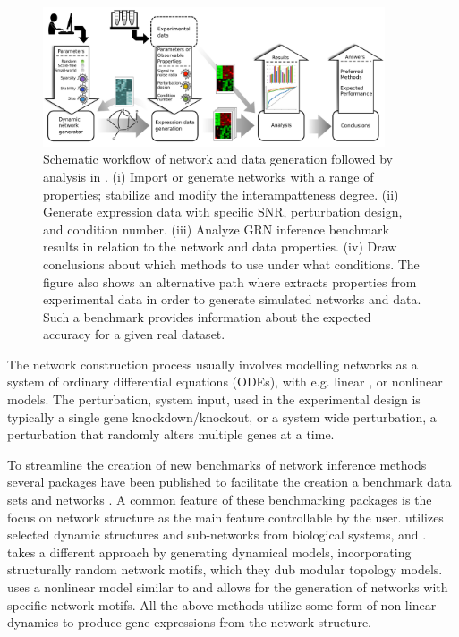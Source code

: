 \begin{figure}
\centering
\includegraphics[width=0.9\textwidth]{img/pipeline.pdf}
\captionsetup{width=0.9\textwidth}
\caption{Schematic workflow of network and data generation followed by analysis in \gs. (i) Import or generate networks with a range of properties; stabilize and modify the interampatteness degree. (ii) Generate expression data with specific SNR, perturbation design, and condition number. (iii) Analyze GRN inference benchmark results in relation to the network and data properties. (iv) Draw conclusions about which methods to use under what conditions. The figure also shows an alternative path where \gs extracts properties from experimental data in order to generate simulated networks and data.  Such a benchmark provides information about the expected accuracy for a given real dataset.}
\label{fig:benchmark-pipeline}
\end{figure}

The network construction process usually involves modelling networks as a system of ordinary differential equations (ODEs), with e.g. linear \citep{Bansal2007}, or nonlinear \citep{VandenBulcke2006,Schaffter2011} models.
The perturbation, \ie system input, used in the experimental design is typically a single gene knockdown/knockout, or a system wide perturbation, \ie a perturbation that randomly alters multiple genes at a time.

To streamline the creation of new benchmarks of network inference methods several packages have been published to facilitate the creation a benchmark data sets and networks \citep{VandenBulcke2006,Hache2009b,DiCamillo2009,Schaffter2011}.
A common feature of these benchmarking packages is the focus on network structure as the main feature controllable by the user.
\emph{\syntren} \citep{VandenBulcke2006} utilizes selected dynamic structures and sub-networks from biological systems, \coli and \yeast.
\emph{\netsim} \citep{DiCamillo2009} takes a different approach by generating dynamical models, incorporating structurally random network motifs, which they dub modular topology models.
\emph{\genge} \citep{Hache2009b} uses a nonlinear model similar to \syntren and allows for the generation of networks with specific network motifs.
All the above methods utilize some form of non-linear dynamics to produce gene expressions from the network structure. 

